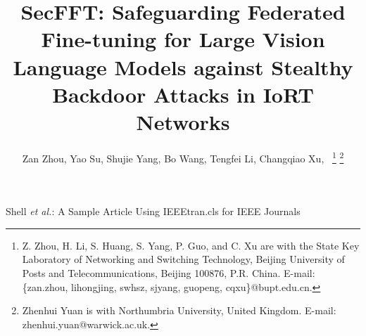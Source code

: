 \documentclass[lettersize,journal]{IEEEtran}
\begin{document}
\title{SecFFT: Safeguarding Federated Fine-tuning for Large Vision Language Models against Stealthy Backdoor Attacks in IoRT Networks}
 
\author{Zan Zhou, %
Yao Su, Shujie Yang, Bo Wang, Tengfei Li, Changqiao Xu,~
\thanks{Z. Zhou, H. Li, S. Huang, S. Yang, P. Guo, and C. Xu are with the State Key Laboratory of Networking and Switching Technology, Beijing University of Posts and Telecommunications, Beijing 100876, P.R. China. E-mail: \{zan.zhou, lihongjing, swhsz, sjyang, guopeng, cqxu\}@bupt.edu.cn. 
	}  %
\thanks{Zhenhui Yuan is with Northumbria University, United Kingdom. E-mail: zhenhui.yuan@warwick.ac.uk.}%
}

%
{Shell \MakeLowercase{\textit{et al.}}: A Sample Article Using IEEEtran.cls for IEEE Journals}


\maketitle
\end{document}
